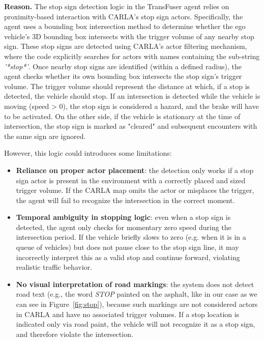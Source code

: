 \noindent\textbf{Reason.} The stop sign detection logic in the TransFuser agent relies on proximity-based interaction with CARLA's stop sign actors. Specifically, the agent uses a bounding box intersection method to determine whether the ego vehicle's 3D bounding box intersects with the trigger volume of any nearby stop sign. These stop signs are detected using CARLA's actor filtering mechanism, where the code explicitly searches for actors with names containing the sub-string \textit{'*stop*'}.
Once nearby stop signs are identified (within a defined radius), the agent checks whether its own bounding box intersects the stop sign’s trigger volume. The trigger volume should represent the distance at which, if a stop is detected, the vehicle should stop. If an intersection is detected while the vehicle is moving (speed > 0), the stop sign is considered a hazard, and the brake will have to be activated. On the other side, if the vehicle is stationary at the time of intersection, the stop sign is marked as "cleared" and subsequent encounters with the same sign are ignored.

However, this logic could introduces some limitations:
\begin{itemize}
    \item\textbf{Reliance on proper actor placement}: the detection only works if a stop sign actor is present in the environment with a correctly placed and sized trigger volume. If the CARLA map omits the actor or misplaces the trigger, the agent will fail to recognize the intersection in the correct moment.
    \item\textbf{Temporal ambiguity in stopping logic}: even when a stop sign is detected, the agent only checks for momentary zero speed during the intersection period. If the vehicle briefly slows to zero (e.g. when it is in a queue of vehicles) but does not pause close to the stop sign line, it may incorrectly interpret this as a valid stop and continue forward, violating realistic traffic behavior.
    \item\textbf{No visual interpretation of road markings}: the system does not detect road text (e.g., the word \textit{STOP} painted on the asphalt, like in our case as we can see in Figure~\ref{fig:stop}), because such markings are not considered actors in CARLA and have no associated trigger volumes. If a stop location is indicated only via road paint, the vehicle will not recognize it as a stop sign, and therefore violate the intersection.
\end{itemize}

